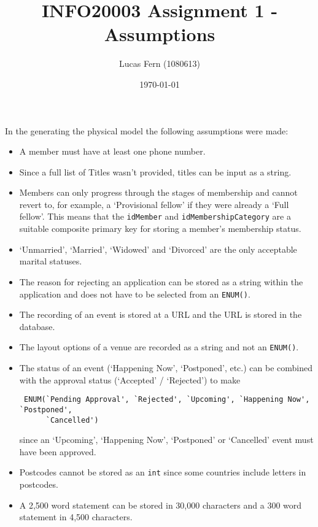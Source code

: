 \documentclass{article}
\title{\vspace{-2cm}INFO20003 Assignment 1 - Assumptions}
\date{\today}
\author{Lucas Fern (1080613)}
\begin{document}
\maketitle
In the generating the physical model the following assumptions were made:
\begin{itemize}
    \item A member must have at least one phone number.
    \item Since a full list of Titles wasn't provided, titles can be input as a string.
    \item Members can only progress through the stages of membership and cannot revert to, for example, a `Provisional fellow' if they were already a `Full fellow'. This means that the \verb|idMember| and \verb|idMembershipCategory| are a suitable composite primary key for storing a member's membership status.
    \item `Unmarried', `Married', `Widowed' and `Divorced' are the only acceptable marital statuses.
    \item The reason for rejecting an application can be stored as a string within the application and does not have to be selected from an \verb|ENUM()|.
    \item The recording of an event is stored at a URL and the URL is stored in the database.
    \item The layout options of a venue are recorded as a string and not an \verb|ENUM()|.
    \item The status of an event (`Happening Now', `Postponed', etc.) can be combined with the approval status (`Accepted' / `Rejected') to make \begin{verbatim} ENUM(`Pending Approval', `Rejected', `Upcoming', `Happening Now', `Postponed', 
      `Cancelled') \end{verbatim}
    since an `Upcoming', `Happening Now', `Postponed' or `Cancelled' event must have been approved.
    \item Postcodes cannot be stored as an \verb|int| since some countries include letters in postcodes.
    \item A 2,500 word statement can be stored in 30,000 characters and a 300 word statement in 4,500 characters.
\end{itemize}


\end{document}
